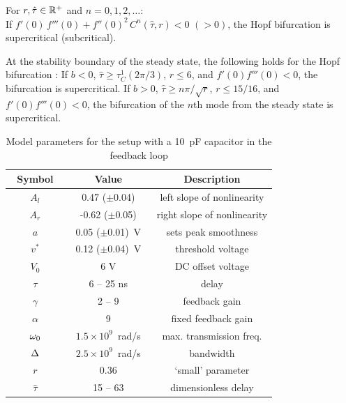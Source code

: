 \documentclass[aps,twocolumn,pre,nofootinbib]{revtex4}
\begin{document}
\bigskip
\begin{prop}
\label{main_theorem}
For $r, \hat{\tau} \in \mathbb{R}^+$ and $n=0,1, 2,\ldots :$  \\
 If $f'(0) \, f'''(0) + f''(0)^2 \, C^n(\hat{\tau},r) < 0$ $(> 0)$, the Hopf bifurcation is supercritical (subcritical).
\end{prop}
%
\begin{cor} At the stability boundary of the steady state, the following holds for the Hopf bifurcation :
\label{cor1}
If $b<0$, $\hat{\tau} \ge \tau_C^1(2 \pi/3)$, $r \le 6$, and $f'(0) f'''(0) < 0$, the bifurcation is supercritical.
 If $b > 0$, $\hat{\tau} \ge n \pi / \sqrt{r}$, $r \le 15/16$, and $f'(0) f'''(0) < 0$, the bifurcation of the $n$th mode from the steady state is supercritical.
\end{cor}


\begin{table}
\caption{Model parameters for the setup with a 10~pF capacitor in the feedback loop}
\begin{center}
\begin{tabular}{|c|c|c|}
\hline
 $\;$ Symbol  $\;$ & Value & Description \\
\hline
 $A_l$ & 0.47 ($\pm$0.04) 	& left slope of nonlinearity		\\
 $A_r$ & -0.62 ($\pm$0.05)     & right slope of nonlinearity	\\
 $a$ & 0.05 ($\pm$0.01)~V       & sets peak smoothness\\
 $v^*$ & $\;$ 0.12 ($\pm$0.04)~V   $\;$  & threshold voltage 			\\
 $V_0$ & 6 V                                & DC offset voltage			\\
\hline
$\tau$ & 6 -- 25 ns & delay  \\
$\gamma$& 2 -- 9 & $\;$ feedback gain  $\;$\\
$\alpha$ & 9 & fixed feedback gain\\
$\omega_0$ & $1.5 \times 10^9$~rad/s & max. transmission freq. \\
$\Delta$ &  $2.5 \times 10^9$~rad/s & bandwidth \\
\hline
$r$&  0.36 & `small' parameter\\
$\hat{\tau}$& 15 -- 63 & dimensionless delay\\
\hline
\end{tabular}
\end{center}
\label{partab}
\end{table}%
\end{document}
